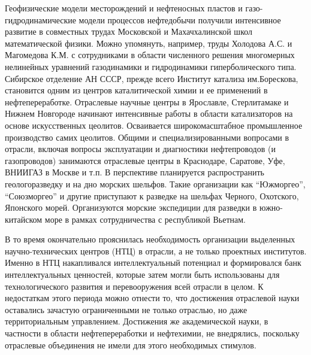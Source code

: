 Геофизические модели месторождений и нефтеносных пластов и газо-гидродинамические модели процессов нефтедобычи получили интенсивное развитие в совместных трудах Московской и Махачхалинской школ математической физики.
Можно упомянуть, например, труды Холодова А.С. и Магомедова К.М. с сотрудниками в области численного решения многомерных нелинейных уравнений газодинамики и гидродинамики гиперболического типа.
Сибирское отделение АН СССР, прежде всего Институт катализа им.Борескова, становится одним из центров каталитической химии и ее применений в нефтепереработке.
Отраслевые научные центры в Ярославле, Стерлитамаке и Нижнем Новгороде начинают интенсивные работы в области катализаторов на основе искусственных цеолитов.
Осваивается широкомасштабное промышленное производство самих цеолитов.
Общими и специализированными вопросами в отрасли, включая вопросы эксплуатации и диагностики нефтепроводов (и газопроводов) занимаются отраслевые центры в Краснодаре, Саратове, Уфе, ВНИИГАЗ в Москве и т.п.
В перспективе планируется распространить геологоразведку и на дно морских шельфов.
Такие организации как ``Южморгео'', ``Союзморгео'' и другие приступают к разведке на шельфах Черного, Охотского, Японского морей.
Организуются морские экспедиции для разведки в южно-китайском море в рамках сотрудничества с республикой Вьетнам.

В то время окончательно прояснилась необходимость организации выделенных научно-технических центров (НТЦ) в отрасли, а не только проектных институтов.
Именно в НТЦ накапливался интеллектуальный потенциал и формировался банк интеллектуальных ценностей, которые затем могли быть использованы для технологического развития и перевооружения всей отрасли в целом.
К недостаткам этого периода можно отнести то, что достижения отраслевой науки оставались зачастую ограниченными не только отраслью, но даже территориальным управлением.
Достижения же академической науки, в частности в области нефтепереработки и нефтехимии, не внедрялись, поскольку отраслевые объединения не имели для этого необходимых стимулов.

